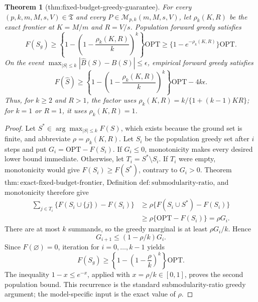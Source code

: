 \documentclass{article}
\newtheorem{theorem}{Theorem}
\begin{document}
\begin{theorem}[thm:fixed-budget-greedy-guarantee]\label{thm:fixed-budget-greedy-guarantee}
For every \((p,k,m,M,s,V)\in\mathfrak T\) and every \(P\in\mathcal M_{p,k}(m,M,s,V)\), let \(\rho_k(K,R)\) be the exact frontier at \(K=M/m\) and \(R=V/s\).  Population forward greedy satisfies
\[
 F(S_g)\ge\left\{1-\left(1-\frac{\rho_k(K,R)}{k}\right)^k\right\}\mathrm{OPT}
 \ge\{1-e^{-\rho_k(K,R)}\}\mathrm{OPT}.
\]
On the event \(\max_{|S|\le k}|\widehat B(S)-B(S)|\le\epsilon\), empirical forward greedy satisfies
\[
 F(\widehat S)\ge
 \left\{1-\left(1-\frac{\rho_k(K,R)}{k}\right)^k\right\}\mathrm{OPT}-4k\epsilon.
\]
Thus, for \(k\ge2\) and \(R>1\), the factor uses \(\rho_k(K,R)=k/\{1+(k-1)KR\}\); for \(k=1\) or \(R=1\), it uses \(\rho_k(K,R)=1\).
\end{theorem}
\begin{proof}
Let \(S^*\in\arg\max_{|S|\le k}F(S)\), which exists because the ground set is finite, and abbreviate \(\rho=\rho_k(K,R)\).  Let \(S_i\) be the population greedy set after \(i\) steps and put \(G_i=\mathrm{OPT}-F(S_i)\).  If \(G_i\le0\), monotonicity makes every desired lower bound immediate.  Otherwise, let \(T_i=S^*\setminus S_i\).  If \(T_i\) were empty, monotonicity would give \(F(S_i)\ge F(S^*)\), contrary to \(G_i>0\).  Theorem \(\mathrm{thm{:}exact\text{-}fixed\text{-}budget\text{-}frontier}\), Definition \(\mathrm{def{:}submodularity\text{-}ratio}\), and monotonicity therefore give
\[
\begin{aligned}
 \sum_{j\in T_i}\{F(S_i\cup\{j\})-F(S_i)\}
 &\ge \rho\{F(S_i\cup S^*)-F(S_i)\}\\
 &\ge \rho\{\mathrm{OPT}-F(S_i)\}=\rho G_i.
\end{aligned}
\]
There are at most \(k\) summands, so the greedy marginal is at least \(\rho G_i/k\).  Hence
\[
 G_{i+1}\le(1-\rho/k)G_i.
\]
Since \(F(\varnothing)=0\), iteration for \(i=0,\ldots,k-1\) yields
\[
 F(S_g)\ge\left\{1-\left(1-\frac\rho k\right)^k\right\}\mathrm{OPT}.
\]
The inequality \(1-x\le e^{-x}\), applied with \(x=\rho/k\in[0,1]\), proves the second population bound.  This recurrence is the standard submodularity-ratio greedy argument; the model-specific input is the exact value of \(\rho\).


\end{proof}
\end{document}
